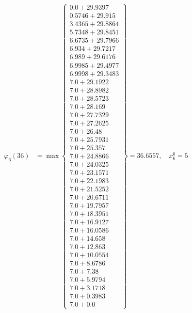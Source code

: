 \documentclass{article}
\begin{document}
\begin{align*}
  
\varphi_{6}(36) &= \max \left\{ \begin{array}{c}
0.0 + 29.9397 \\
 0.5746 + 29.915 \\
 3.4365 + 29.8864 \\
 5.7348 + 29.8451 \\
 6.6735 + 29.7966 \\
 6.934 + 29.7217 \\
 6.989 + 29.6176 \\
 6.9985 + 29.4977 \\
 6.9998 + 29.3483 \\
 7.0 + 29.1922 \\
 7.0 + 28.8982 \\
 7.0 + 28.5723 \\
 7.0 + 28.169 \\
 7.0 + 27.7329 \\
 7.0 + 27.2625 \\
 7.0 + 26.48 \\
 7.0 + 25.7931 \\
 7.0 + 25.357 \\
 7.0 + 24.8866 \\
 7.0 + 24.0325 \\
 7.0 + 23.1571 \\
 7.0 + 22.1983 \\
 7.0 + 21.5252 \\
 7.0 + 20.6711 \\
 7.0 + 19.7957 \\
 7.0 + 18.3951 \\
 7.0 + 16.9127 \\
 7.0 + 16.0586 \\
 7.0 + 14.658 \\
 7.0 + 12.863 \\
 7.0 + 10.0554 \\
 7.0 + 8.6786 \\
 7.0 + 7.38 \\
 7.0 + 5.9794 \\
 7.0 + 3.1718 \\
 7.0 + 0.3983 \\
 7.0 + 0.0
\end{array} \right\}=36.6557,\quad x_{6}^0=5\\
  
  
\end{align*}
\end{document}

